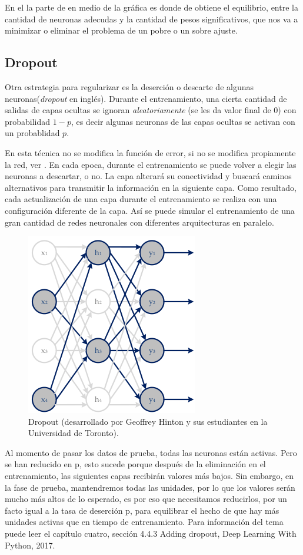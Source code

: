  En el la parte de en medio de la gráfica  es donde de obtiene el equilibrio, entre la cantidad de neuronas adecudas y la cantidad de pesos significativos, que nos va a minimizar o eliminar el problema de un pobre o un sobre ajuste.
 
 \subsection{Dropout}
 
 Otra estrategia para regularizar es la deserción o descarte de algunas neuronas(\emph{dropout} en inglés). 
 Durante el entrenamiento, una cierta cantidad de salidas de capas ocultas se ignoran \emph{aleatoriamente} (se les da valor final de 0) con probabilidad $1-p$, es decir algunas neuronas de las capas ocultas se activan con un probablidad $p$. 

 En esta técnica no se modifica la función de error, si no se modifica propiamente la red, ver . En cada epoca, durante el entrenamiento se puede volver a elegir las neuronas a descartar, o no. 
 La capa alterará su conectividad y buscará caminos alternativos para transmitir la información en la siguiente capa. Como resultado, cada actualización de una capa durante el entrenamiento se realiza con una configuración diferente de la capa. Así se puede simular el entrenamiento de una gran cantidad de redes neuronales con diferentes arquitecturas en paralelo.

  \begin{figure}[h]
   \centering
   \includegraphics[scale=.5]{../Figuras/dropout.png}
   \caption{Dropout (desarrollado por Geoffrey Hinton y sus estudiantes en la Universidad de Toronto).}
  \label{fig:dropout}
  \end{figure}

 Al momento de pasar los datos de prueba, todas las neuronas están activas. Pero se han reducido en p, esto sucede porque después de la eliminación en el entrenamiento, las siguientes capas recibirán valores más bajos. Sin embargo, en la fase de prueba, mantendremos todas las unidades, por lo que los valores serán mucho más altos de lo esperado, es por eso que necesitamos reducirlos, por un facto igual a la tasa de deserción p, para equilibrar el hecho de que hay más unidades activas que en tiempo de entrenamiento. Para información del tema puede leer el capítulo cuatro, sección 4.4.3 Adding dropout, Deep Learning With Python, 2017.  
 
 

